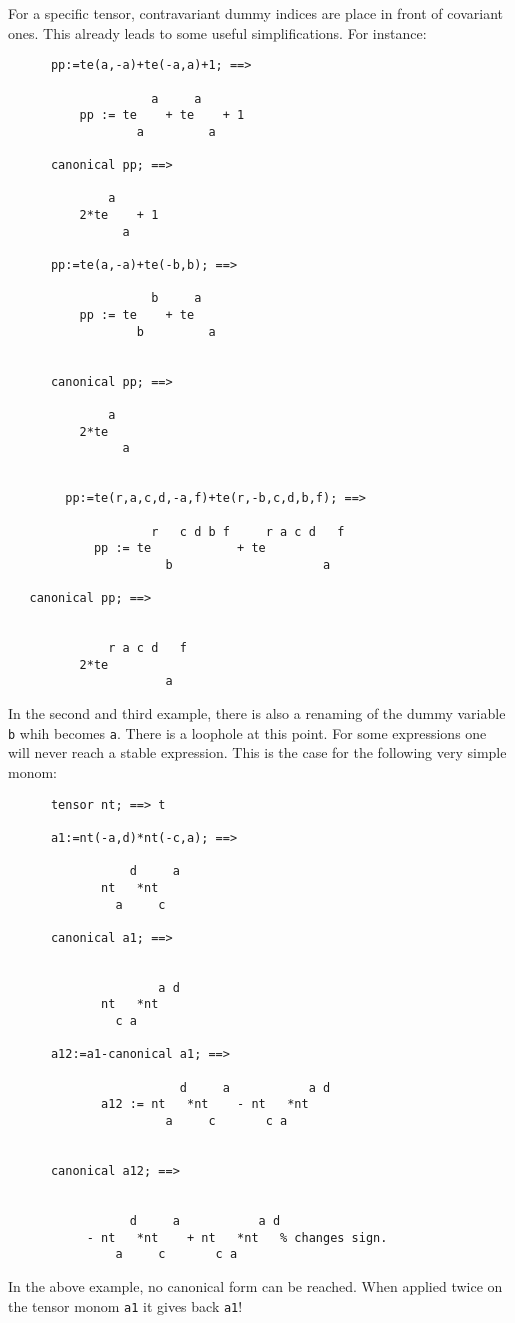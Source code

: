 For a specific tensor, contravariant dummy indices are place 
in front of covariant ones. This already leads to some useful 
simplifications. For instance:
\begin{verbatim}
      pp:=te(a,-a)+te(-a,a)+1; ==> 

                    a     a
          pp := te    + te    + 1
                  a         a

      canonical pp; ==>

              a
          2*te    + 1
                a

      pp:=te(a,-a)+te(-b,b); ==>

                    b     a
          pp := te    + te
                  b         a


      canonical pp; ==> 

              a
          2*te
                a


        pp:=te(r,a,c,d,-a,f)+te(r,-b,c,d,b,f); ==>

                    r   c d b f     r a c d   f
            pp := te            + te
                      b                     a

   canonical pp; ==>


              r a c d   f
          2*te
                      a

\end{verbatim}
In the second and third example, there is also a renaming of the 
dummy variable \texttt{b} whih becomes \texttt{a}. 
There is a loophole at this point. For some expressions one will 
never reach a stable expression. 
This is the case for the following very simple monom:
\begin{verbatim}
      tensor nt; ==> t

      a1:=nt(-a,d)*nt(-c,a); ==>

                 d     a
             nt   *nt
               a     c

      canonical a1; ==>

    
                     a d
             nt   *nt
               c a

      a12:=a1-canonical a1; ==> 

                        d     a           a d
             a12 := nt   *nt    - nt   *nt
                      a     c       c a


      canonical a12; ==>


                 d     a           a d
           - nt   *nt    + nt   *nt   % changes sign.
               a     c       c a

\end{verbatim}
In the above example, no canonical form can be reached. When applied twice 
on the tensor monom \texttt{a1} it gives back \texttt{a1}!  

